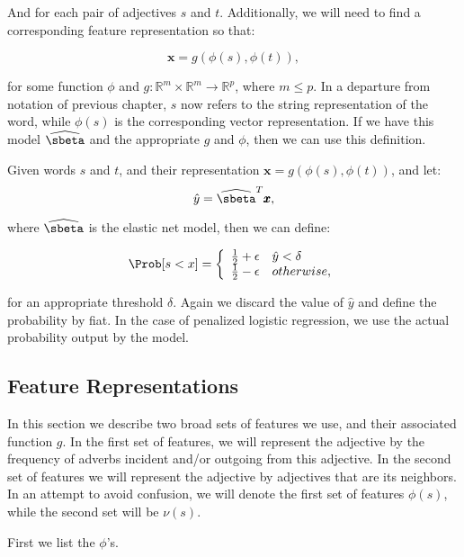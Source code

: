 And for each pair of adjectives $s$ and $t$. Additionally, we will need to find a corresponding feature representation so that:

	\[
		\pmb{x} = g(\phi(s), \phi(t)),
	\]

for some function $\phi$ and $g : \mathbb{R}^m \times \mathbb{R}^m \rightarrow \mathbb{R}^p$, where $m \leq p$. In a departure from notation of previous chapter, $s$ now refers to the string representation of the word, while $\phi(s)$ is the corresponding vector representation. If we have this model $\widehat{\sbeta}$ and the appropriate $g$ and $\phi$, then we can use this definition.

\begin{definition}

Given words $s$ and $t$, and their representation $\pmb{x} = g(\phi(s), \phi(t))$, and let:
	\[
		\hat{y} = \widehat{\sbeta}^{T} \pmb{x},
	\]

where $\widehat{\sbeta}$ is the elastic net model, then we can define:

\[   
\Prob[s < x ] = \left\{
\begin{array}{ll}
      \frac{1}{2} + \epsilon & \hat{y} < \delta \\
      \frac{1}{2} - \epsilon & otherwise,
\end{array} 
\right. 
\]

for an appropriate threshold $\delta$. Again we discard the value of $\hat{y}$ and define the probability by fiat. In the case of penalized logistic regression, we use the actual probability output by the model.


\end{definition}

\subsection{Feature Representations}

In this section we describe two broad sets of features we use, and their associated function $g$. In the first set of features, we will represent the adjective by the frequency of adverbs incident and/or outgoing from this adjective. In the second set of features we will represent the adjective by adjectives that are its neighbors. In an attempt to avoid confusion, we will denote the first set of features $\phi(s)$, while the second set will be $\nu(s)$.

First we list the $\phi$'s.

